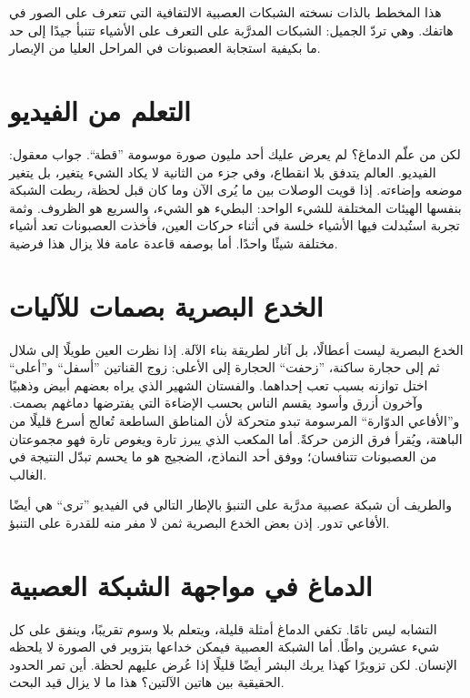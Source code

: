 هذا المخطط بالذات نسخته الشبكات العصبية الالتفافية التي تتعرف على الصور في هاتفك. وهي تردّ الجميل: الشبكات المدرَّبة على التعرف على الأشياء تتنبأ جيدًا إلى حد ما بكيفية استجابة العصبونات في المراحل العليا من الإبصار.

\section*{التعلم من الفيديو}

لكن من علّم الدماغ؟ لم يعرض عليك أحد مليون صورة موسومة ”قطة“. جواب معقول: الفيديو. العالم يتدفق بلا انقطاع، وفي جزء من الثانية لا يكاد الشيء يتغير، بل يتغير موضعه وإضاءته. إذا قويت الوصلات بين ما يُرى الآن وما كان قبل لحظة، ربطت الشبكة بنفسها الهيئات المختلفة للشيء الواحد: البطيء هو الشيء، والسريع هو الظروف. وثمة تجربة استُبدلت فيها الأشياء خلسة في أثناء حركات العين، فأخذت العصبونات تعد أشياء مختلفة شيئًا واحدًا. أما بوصفه قاعدة عامة فلا يزال هذا فرضية.

\section*{الخدع البصرية بصمات للآليات}

الخدع البصرية ليست أعطالًا، بل آثار لطريقة بناء الآلة. إذا نظرت العين طويلًا إلى شلال ثم إلى حجارة ساكنة، ”زحفت“ الحجارة إلى الأعلى: زوج القناتين ”أسفل“ و”أعلى“ اختل توازنه بسبب تعب إحداهما. والفستان الشهير الذي يراه بعضهم أبيض وذهبيًا وآخرون أزرق وأسود يقسم الناس بحسب الإضاءة التي يفترضها دماغهم بصمت. و”الأفاعي الدوّارة“ المرسومة تبدو متحركة لأن المناطق الساطعة تُعالج أسرع قليلًا من الباهتة، ويُقرأ فرق الزمن حركةً. أما المكعب الذي يبرز تارة ويغوص تارة فهو مجموعتان من العصبونات تتنافسان؛ ووفق أحد النماذج، الضجيج هو ما يحسم تبدّل النتيجة في الغالب.

والطريف أن شبكة عصبية مدرَّبة على التنبؤ بالإطار التالي في الفيديو ”ترى“ هي أيضًا الأفاعي تدور. إذن بعض الخدع البصرية ثمن لا مفر منه للقدرة على التنبؤ.

\section*{الدماغ في مواجهة الشبكة العصبية}

التشابه ليس تامًا. تكفي الدماغ أمثلة قليلة، ويتعلم بلا وسوم تقريبًا، وينفق على كل شيء عشرين واطًا. أما الشبكة العصبية فيمكن خداعها بتزوير في الصورة لا يلحظه الإنسان. لكن تزويرًا كهذا يربك البشر أيضًا قليلًا إذا عُرض عليهم لحظة. أين تمر الحدود الحقيقية بين هاتين الآلتين؟ هذا ما لا يزال قيد البحث.

